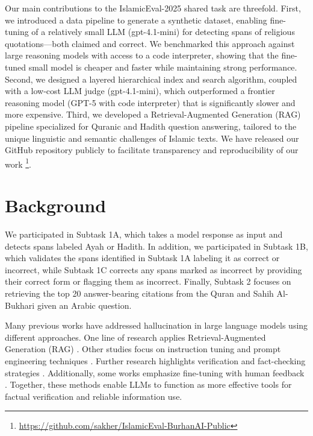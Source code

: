 \documentclass[11pt]{article}
\begin{document}
Our main contributions to the IslamicEval-2025 \citet{mubarak2025islamiceval} shared task are threefold. First, we introduced a data pipeline to generate a synthetic dataset, enabling fine-tuning of a relatively small LLM (gpt-4.1-mini) for detecting spans of religious quotations—both claimed and correct. We benchmarked this approach against large reasoning models with access to a code interpreter, showing that the fine-tuned small model is cheaper and faster while maintaining strong performance. Second, we designed a layered hierarchical index and search algorithm, coupled with a low-cost LLM judge (gpt-4.1-mini), which outperformed a frontier reasoning model (GPT-5 with code interpreter) that is significantly slower and more expensive. Third, we developed a Retrieval-Augmented Generation (RAG) pipeline specialized for Quranic and Hadith question answering, tailored to the unique linguistic and semantic challenges of Islamic texts. We have released our GitHub repository publicly to facilitate transparency and reproducibility of our work \footnote{\url{https://github.com/sakher/IslamicEval-BurhanAI-Public}}. 



\section{Background}
We participated in Subtask 1A, which takes a model response as input and detects spans labeled Ayah or Hadith. In addition, we participated in Subtask 1B, which validates the spans identified in Subtask 1A labeling it as correct or incorrect, while Subtask 1C corrects any spans marked as incorrect by providing their correct form or flagging them as incorrect. Finally, Subtask 2 focuses on retrieving the top 20 answer-bearing citations from the Quran and Sahih Al-Bukhari given an Arabic question.


Many previous works have addressed hallucination in large language models using different approaches. 
One line of research applies Retrieval-Augmented Generation (RAG) \citet{Bechard2024ReducingHI,Alan2024ARQ, Khalila2025InvestigatingRG}. Other studies focus on instruction tuning and prompt engineering techniques \citet{Barkley2024InvestigatingTR, Hikal2025MSAAS}. 
Further research highlights verification and fact-checking strategies \citet{Sibaee2024ASOSAA}. 
Additionally, some works emphasize fine-tuning with human feedback \citet{Cheng2025ThinkMH,Lin2025Harnessing}. 
Together, these methods enable LLMs to function as more effective tools for factual verification and reliable information use.
\end{document}
